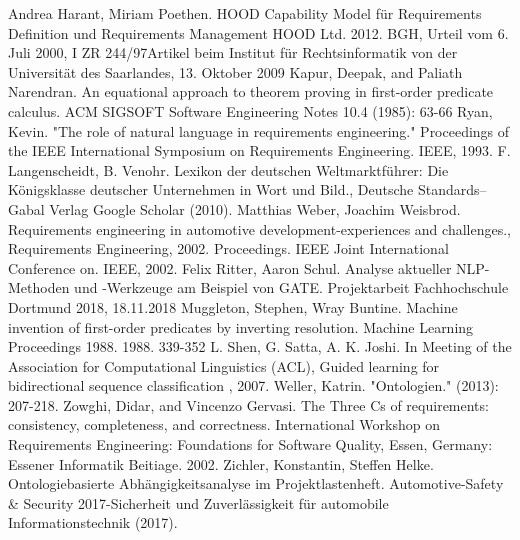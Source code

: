 \documentclass[12pt]{report}
\begin{document}
\begin{thebibliography}{20}
Andrea Harant, Miriam Poethen. \glqq HOOD Capability Model für Requirements Definition und Requirements Management \grqq{} HOOD Ltd. 2012.
BGH, \glqq Urteil vom 6. Juli 2000, I ZR 244/97\grqq Artikel beim Institut für Rechtsinformatik von der Universität des Saarlandes, 13. Oktober 2009
Kapur, Deepak, and Paliath Narendran. \glqq  An equational approach to theorem proving in first-order predicate calculus.\grqq{}  ACM SIGSOFT Software Engineering Notes 10.4 (1985): 63-66
Ryan, Kevin. "The role of natural language in requirements engineering." Proceedings of the IEEE International Symposium on Requirements Engineering. IEEE, 1993.
F. Langenscheidt, B. Venohr. \glqq Lexikon der deutschen Weltmarktführer: Die Königsklasse deutscher Unternehmen in Wort und Bild.\grqq ,  Deutsche Standards–Gabal Verlag Google Scholar (2010).
Matthias Weber, Joachim Weisbrod. \glqq Requirements engineering in automotive development-experiences and challenges.\grqq , Requirements Engineering, 2002. Proceedings. IEEE Joint International Conference on. IEEE, 2002.
Felix Ritter, Aaron Schul. \glqq Analyse aktueller NLP-Methoden und -Werkzeuge am Beispiel von GATE.\grqq{} Projektarbeit Fachhochschule Dortmund 2018, 18.11.2018
Muggleton, Stephen, Wray Buntine. \glqq  Machine invention of first-order predicates by inverting resolution.\grqq{}  Machine Learning Proceedings 1988. 1988. 339-352
 L. Shen, G. Satta, A. K. Joshi. In Meeting of the Association for Computational Linguistics (ACL), \glqq  Guided learning for bidirectional sequence classification\grqq{} , 2007.
 Weller, Katrin. "Ontologien." (2013): 207-218.
 Zowghi, Didar, and Vincenzo Gervasi. \glqq The Three Cs of requirements: consistency, completeness, and correctness.\grqq{} International Workshop on Requirements Engineering: Foundations for Software Quality, Essen, Germany: Essener Informatik Beitiage. 2002.
 Zichler, Konstantin, Steffen Helke. \glqq Ontologiebasierte Abhängigkeitsanalyse im Projektlastenheft.\grqq{} Automotive-Safety \& Security 2017-Sicherheit und Zuverlässigkeit für automobile Informationstechnik (2017).



\end{thebibliography}
\end{document}
